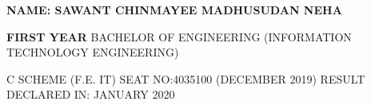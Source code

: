 \documentclass{article} %
\begin{document}
\noindent 

\noindent 

\noindent 

\noindent 

\noindent 

\noindent \textbf{\underbar{}}

\noindent \textbf{}

\noindent 

\noindent \textbf{NAME: SAWANT CHINMAYEE MADHUSUDAN NEHA}

\noindent 

\noindent \textbf{FIRST YEAR} BACHELOR OF ENGINEERING (INFORMATION TECHNOLOGY ENGINEERING)

\noindent 

\noindent \textbf{}  C SCHEME (F.E. IT)       SEAT NO:4035100 (DECEMBER 2019)      RESULT DECLARED IN: JANUARY 2020

\noindent 

\noindent 
\end{document}
